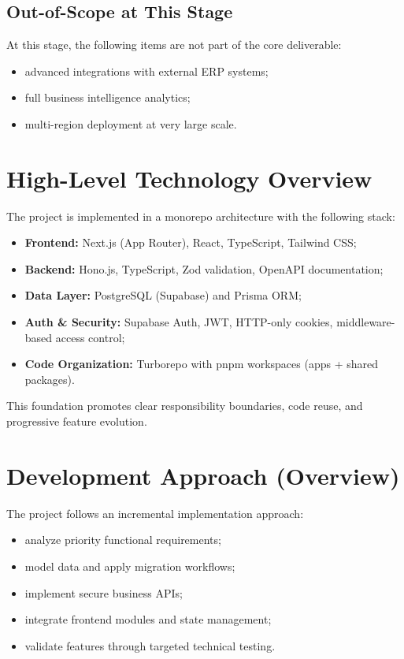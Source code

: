 \documentclass[12pt,a4paper]{report}
\begin{document}
\subsection{Out-of-Scope at This Stage}
At this stage, the following items are not part of the core deliverable:
\begin{itemize}
  \item advanced integrations with external ERP systems;
  \item full business intelligence analytics;
  \item multi-region deployment at very large scale.
\end{itemize}

\section{High-Level Technology Overview}
The project is implemented in a monorepo architecture with the following stack:
\begin{itemize}
  \item \textbf{Frontend:} Next.js (App Router), React, TypeScript, Tailwind CSS;
  \item \textbf{Backend:} Hono.js, TypeScript, Zod validation, OpenAPI documentation;
  \item \textbf{Data Layer:} PostgreSQL (Supabase) and Prisma ORM;
  \item \textbf{Auth \& Security:} Supabase Auth, JWT, HTTP-only cookies, middleware-based access control;
  \item \textbf{Code Organization:} Turborepo with pnpm workspaces (apps + shared packages).
\end{itemize}

This foundation promotes clear responsibility boundaries, code reuse, and progressive feature evolution.

\section{Development Approach (Overview)}
The project follows an incremental implementation approach:
\begin{itemize}
  \item analyze priority functional requirements;
  \item model data and apply migration workflows;
  \item implement secure business APIs;
  \item integrate frontend modules and state management;
  \item validate features through targeted technical testing.
\end{itemize}
\end{document}
